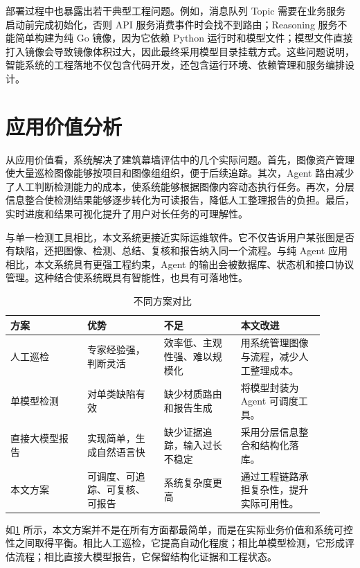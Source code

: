 部署过程中也暴露出若干典型工程问题。例如，消息队列 Topic 需要在业务服务启动前完成初始化，否则 API 服务消费事件时会找不到路由；Reasoning 服务不能简单构建为纯 Go 镜像，因为它依赖 Python 运行时和模型文件；模型文件直接打入镜像会导致镜像体积过大，因此最终采用模型目录挂载方式。这些问题说明，智能系统的工程落地不仅包含代码开发，还包含运行环境、依赖管理和服务编排设计。

\section{应用价值分析}
\label{sec:application-value}

从应用价值看，系统解决了建筑幕墙评估中的几个实际问题。首先，图像资产管理使大量巡检图像能够按项目和图像组组织，便于后续追踪。其次，Agent 路由减少了人工判断检测能力的成本，使系统能够根据图像内容动态执行任务。再次，分层信息整合使检测结果能够逐步转化为可读报告，降低人工整理报告的负担。最后，实时进度和结果可视化提升了用户对长任务的可理解性。

与单一检测工具相比，本文系统更接近实际运维软件。它不仅告诉用户某张图是否有缺陷，还把图像、检测、总结、复核和报告纳入同一个流程。与纯 Agent 应用相比，本文系统具有更强工程约束，Agent 的输出会被数据库、状态机和接口协议管理。这种结合使系统既具有智能性，也具有可落地性。

\begin{table}[!htb]
  \caption{不同方案对比}\label{tab:solution-comparison}
  \centering
  \begin{tabular}{@{}p{0.22\linewidth}p{0.22\linewidth}p{0.22\linewidth}p{0.24\linewidth}@{}} \toprule
    \textbf{方案} & \textbf{优势} & \textbf{不足} & \textbf{本文改进} \\ \midrule
    人工巡检 & 专家经验强，判断灵活 & 效率低、主观性强、难以规模化 & 用系统管理图像与流程，减少人工整理成本。 \\
    单模型检测 & 对单类缺陷有效 & 缺少材质路由和报告生成 & 将模型封装为 Agent 可调度工具。 \\
    直接大模型报告 & 实现简单，生成自然语言快 & 缺少证据追踪，输入过长不稳定 & 采用分层信息整合和结构化落库。 \\
    本文方案 & 可调度、可追踪、可复核、可报告 & 系统复杂度更高 & 通过工程链路承担复杂性，提升实际可用性。 \\ \bottomrule
  \end{tabular}
\end{table}

如\cref{tab:solution-comparison} 所示，本文方案并不是在所有方面都最简单，而是在实际业务价值和系统可控性之间取得平衡。相比人工巡检，它提高自动化程度；相比单模型检测，它形成评估流程；相比直接大模型报告，它保留结构化证据和工程状态。

